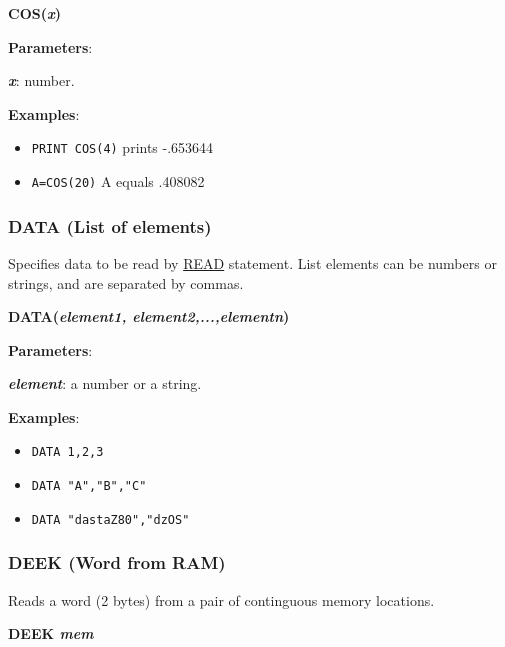     \hspace{1.9cm}\textbf{COS(\textit{x})}

    \textbf{Parameters}:

    \hspace{1cm}\textbf{\textit{x}}: number.

    \textbf{Examples}:
    \begin{itemize}
        \item \texttt{PRINT COS(4)} prints -.653644
        \item \texttt{A=COS(20)} A equals .408082
    \end{itemize}

    \subsubsection{{DATA (List of elements)}}
    \label{msbasic:lang:data}
    Specifies data to be read by \hyperref[msbasic:lang:read]{READ} statement.
    List elements can be numbers or strings, and are separated by commas.

    \hspace{1.9cm}\textbf{DATA(\textit{element1, element2,...,elementn})}

    \textbf{Parameters}:

    \hspace{1cm}\textbf{\textit{element}}: a number or a string.

    \textbf{Examples}:
    \begin{itemize}
        \item \texttt{DATA 1,2,3}
        \item \texttt{DATA "A","B","C"}
        \item \texttt{DATA "dastaZ80","dzOS"}
    \end{itemize}

    \subsubsection{{DEEK (Word from RAM)}}
    \label{msbasic:lang:deek}
    Reads a word (2 bytes) from a pair of continguous memory locations.

    \hspace{1.9cm}\textbf{DEEK \textit{mem}}

